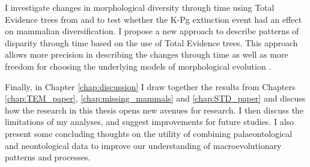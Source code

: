 I investigate changes in morphological diversity \citep[or disparity;][]{Wills1994} through time using Total Evidence trees from \cite{slaterphylogenetic2013} and \cite{beckancient2014} to test whether the K-Pg extinction event had an effect on mammalian diversification.
I propose a new approach to describe patterns of disparity through time based on the use of Total Evidence trees.
This approach allows more precision in describing the changes through time as well as more freedom for choosing the underlying models of morphological evolution \citep[e.g. punctuated or gradual;][]{Hunt21042015}.

Finally, in Chapter \ref{chap:discussion} I draw together the results from Chapters \ref{chap:TEM_paper}, \ref{chap:missing_mammals} and \ref{chap:STD_paper} and discuss how the research in this thesis opens new avenues for research.
I then discuss the limitations of my analyses, and suggest improvements for future studies.
I also present some concluding thoughts on the utility of combining palaeontological and neontological data to improve our understanding of macroevolutionary patterns and processes.

%